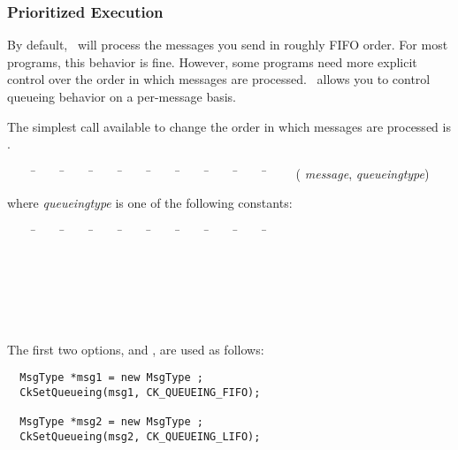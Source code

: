 \subsubsection{Prioritized Execution}
\label{prioritized message passing}

By default, \charmpp\ will process the messages you send in roughly
FIFO order.  For most programs, this
behavior is fine.  However, some programs need more explicit control
over the order in which messages are processed.  \charmpp\ allows you
to control queueing behavior on a per-message basis.

The simplest call available to change the order in which messages
are processed is .

\begin{tabbing}
~~~~ \=~~~~ \=~~~~ \=~~~~ \=~~~~ \=~~~~ \=~~~~ \=~~~~ \=~~~~ \=~~~~ \kill
\> ( {\it message},  {\it
queueingtype}) \\
\end{tabbing}

where {\it queueingtype} is one of the following
constants:

\begin{tabbing}
~~~~ \=~~~~ \=~~~~ \=~~~~ \=~~~~ \=~~~~ \=~~~~ \=~~~~ \=~~~~ \=~~~~ \kill
\> \\
\> \\
\> \\
\> \\
\> \\
\> \\
\end{tabbing}

The first two options,   and
, are used as follows: 

\begin{verbatim}
  MsgType *msg1 = new MsgType ;
  CkSetQueueing(msg1, CK_QUEUEING_FIFO);

  MsgType *msg2 = new MsgType ;
  CkSetQueueing(msg2, CK_QUEUEING_LIFO);
\end{verbatim}

